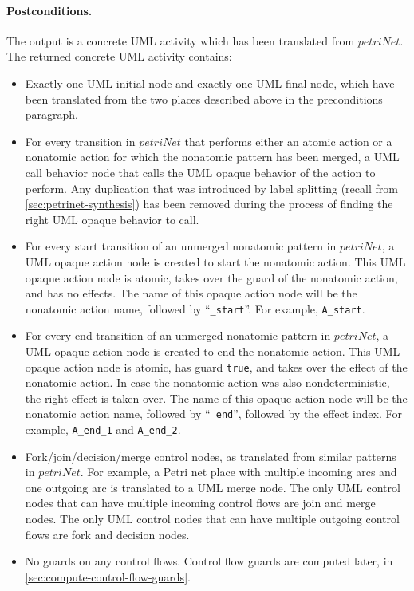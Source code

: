 \documentclass{article}
\newcommand{\var}[1]{\ensuremath{\mathit{#1}}}
\theoremstyle{definition}
\begin{document}
\paragraph{Postconditions.}
The output is a concrete UML activity which has been translated from \var{petriNet}.
The returned concrete UML activity contains:
\begin{itemize}
	\item Exactly one UML initial node and exactly one UML final node, which have been translated from the two places described above in the preconditions paragraph.
	\item For every transition in \var{petriNet} that performs either an atomic action or a nonatomic action for which the nonatomic pattern has been merged, a UML call behavior node that calls the UML opaque behavior of the action to perform.
	Any duplication that was introduced by label splitting (recall from \autoref{sec:petrinet-synthesis}) has been removed during the process of finding the right UML opaque behavior to call.
	\item For every start transition of an unmerged nonatomic pattern in \var{petriNet}, a UML opaque action node is created to start the nonatomic action.
	This UML opaque action node is atomic, takes over the guard of the nonatomic action, and has no effects.
	The name of this opaque action node will be the nonatomic action name, followed by ``\texttt{\_start}''.
	For example, \texttt{A\_start}.
	\item For every end transition of an unmerged nonatomic pattern in \var{petriNet}, a UML opaque action node is created to end the nonatomic action.
	This UML opaque action node is atomic, has guard \texttt{true}, and takes over the effect of the nonatomic action.
	In case the nonatomic action was also nondeterministic, the right effect is taken over.
	The name of this opaque action node will be the nonatomic action name, followed by ``\texttt{\_end}'', followed by the effect index.
	For example, \texttt{A\_end\_1} and \texttt{A\_end\_2}.
	\item Fork/join/decision/merge control nodes, as translated from similar patterns in \var{petriNet}.
	For example, a Petri net place with multiple incoming arcs and one outgoing arc is translated to a UML merge node.
	The only UML control nodes that can have multiple incoming control flows are join and merge nodes.
	The only UML control nodes that can have multiple outgoing control flows are fork and decision nodes.
	\item No guards on any control flows.
	Control flow guards are computed later, in \autoref{sec:compute-control-flow-guards}.
\end{itemize}
\end{document}
